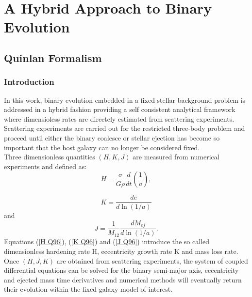 \documentclass[12pt,twoside,openany]{book}
\begin{document}
%





\chapter{A Hybrid Approach to Binary Evolution}\label{chap:chapter2}



\section{Quinlan Formalism}
\subsection{Introduction}
In this work, binary evolution embedded in a fixed stellar background problem is addressed in a hybrid fashion providing a self consistent analytical framework where dimensioless rates are directely estimated from scattering experiments.\\Scattering experiments are carried out for the restricted three-body problem and proceed until either the binary coalesce or stellar ejection has become so important that the host galaxy can no longer be considered fixed.\\Three dimensionless quantities $(H,K,J)$ are measured from numerical experiments and defined as:
\begin{equation}\label{H Q96}
    H=\frac{\sigma}{G\rho}\frac{d}{dt}\left(\frac{1}{a}\right),
\end{equation}

\begin{equation}\label{K Q96}
    K=\frac{de}{d\ln({1/a})}
\end{equation}
and 
\begin{equation}\label{J Q96}
    J=\frac{1}{M_{12}}\frac{dM_{ej}}{d\ln({1/a})}.
\end{equation}
Equations (\ref{H Q96}), (\ref{K Q96}) and (\ref{J Q96}) introduce the so called dimensionless hardening
rate H, eccentricity growth rate K and mass loss rate. Once $(H,J,K)$ are obtained from scattering experiments, the system of coupled differential equations can be solved for the binary semi-major axis, eccentricity and ejected mass time derivatives and numerical methods will eventually return their evolution within the fixed galaxy model of interest.
\end{document}
